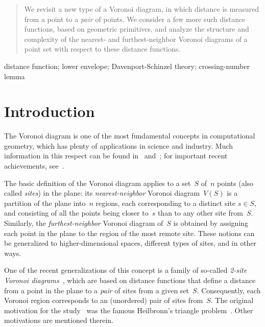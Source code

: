\documentclass[10pt, conference, compsocconf]{IEEEtran}
\begin{document}
\maketitle



\begin{abstract}
   We revisit a new type of a Voronoi diagram, in which
   distance is measured from a point to a \emph{pair} of points.
   We consider a few more such distance functions, based on geometric primitives, and analyze the structure and complexity of the nearest- and furthest-neighbor Voronoi
   diagrams of a point set with respect to these distance functions.
\end{abstract}

\begin{IEEEkeywords}
   distance function; lower envelope;
   Davenport-Schinzel theory; crossing-number lemma
\end{IEEEkeywords}

\IEEEpeerreviewmaketitle



\section{Introduction}

The Voronoi diagram is one of the most fundamental concepts in computational
geometry, which has plenty of applications in science and industry.  Much
information in this respect can be found in~\cite{Au91} and~\cite{OBS00};
for important recent achievements, see~\cite{G08}.

The basic definition of the Voronoi diagram applies to a set~$S$ of~$n$
points (also called \emph{sites}) in the plane: its \emph{nearest-neighbor}
Voronoi diagram~$V(S)$ is a partition of the plane into~$n$ regions, each
corresponding to a distinct site $s\in S$, and consisting of all the points
being closer to~$s$ than to any other site from~$S$.  Similarly, the
\emph{furthest-neighbor} Voronoi diagram of~$S$ is obtained by assigning
each point in the plane to the region of the most remote site.  These
notions can be generalized to higher-dimensional spaces, different types of
sites, and in other ways.

One of the recent generalizations of this concept is a family of so-called
\emph{2-site Voronoi diagrams}~\cite{BDD02}, which are based on distance
functions that define a distance from a point in the plane to a \emph{pair}
of sites from a given set~$S$.  Consequently, each Voronoi region corresponds
to an (unordered) pair of sites from~$S$.
The original motivation for the study~\cite{BDD02} was the famous
Heilbronn's triangle problem~\cite{Ro51}.  Other motivations are mentioned
therein.
\end{document}
